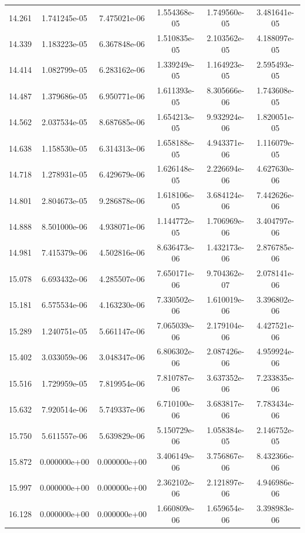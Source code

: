 \documentclass[fleqn,usenatbib]{mnras}
\begin{document}
\begin{table}
\begin{tabular}{c|cc|ccc}
        14.261 & 1.741245e-05 & 7.475021e-06 & 1.554368e-05 & 1.749560e-05 & 3.481641e-05 \\ 
        14.339 & 1.183223e-05 & 6.367848e-06 & 1.510835e-05 & 2.103562e-05 & 4.188097e-05 \\ 
        14.414 & 1.082799e-05 & 6.283162e-06 & 1.339249e-05 & 1.164923e-05 & 2.595493e-05 \\ 
        14.487 & 1.379686e-05 & 6.950771e-06 & 1.611393e-05 & 8.305666e-06 & 1.743608e-05 \\ \hline
        14.562 & 2.037534e-05 & 8.687685e-06 & 1.654213e-05 & 9.932924e-06 & 1.820051e-05 \\ 
        14.638 & 1.158530e-05 & 6.314313e-06 & 1.658188e-05 & 4.943371e-06 & 1.116079e-05 \\ 
        14.718 & 1.278931e-05 & 6.429679e-06 & 1.626148e-05 & 2.226694e-06 & 4.627630e-06 \\ 
        14.801 & 2.804673e-05 & 9.286878e-06 & 1.618106e-05 & 3.684124e-06 & 7.442626e-06 \\ 
        14.888 & 8.501000e-06 & 4.938071e-06 & 1.144772e-05 & 1.706969e-06 & 3.404797e-06 \\ \hline
        14.981 & 7.415379e-06 & 4.502816e-06 & 8.636473e-06 & 1.432173e-06 & 2.876785e-06 \\ 
        15.078 & 6.693432e-06 & 4.285507e-06 & 7.650171e-06 & 9.704362e-07 & 2.078141e-06 \\ 
        15.181 & 6.575534e-06 & 4.163230e-06 & 7.330502e-06 & 1.610019e-06 & 3.396802e-06 \\ 
        15.289 & 1.240751e-05 & 5.661147e-06 & 7.065039e-06 & 2.179104e-06 & 4.427521e-06 \\ 
        15.402 & 3.033059e-06 & 3.048347e-06 & 6.806302e-06 & 2.087426e-06 & 4.959924e-06 \\ \hline
        15.516 & 1.729959e-05 & 7.819954e-06 & 7.810787e-06 & 3.637352e-06 & 7.233835e-06 \\ 
        15.632 & 7.920514e-06 & 5.749337e-06 & 6.710100e-06 & 3.683817e-06 & 7.783434e-06 \\ 
        15.750 & 5.611557e-06 & 5.639829e-06 & 5.150729e-06 & 1.058384e-05 & 2.146752e-05 \\ 
        15.872 & 0.000000e+00 & 0.000000e+00 & 3.406149e-06 & 3.756867e-06 & 8.432366e-06 \\ 
        15.997 & 0.000000e+00 & 0.000000e+00 & 2.362102e-06 & 2.121897e-06 & 4.946986e-06 \\ \hline
        16.128 & 0.000000e+00 & 0.000000e+00 & 1.660809e-06 & 1.659654e-06 & 3.398983e-06 \\ 

\end{tabular}
\end{table}
\end{document}
